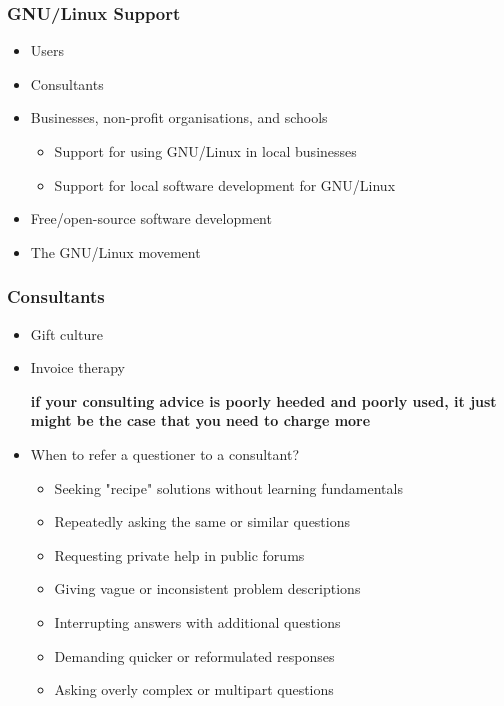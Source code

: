 \documentclass{beamer}
\begin{document}
	\begin{frame}
		\frametitle{GNU/Linux Support}
		\begin{itemize}
			\pause
			\item Users
			\pause
			\item Consultants
			\pause
			\item Businesses, non-profit organisations, and schools
			\begin{itemize}
				\pause
				\item Support for using GNU/Linux in local businesses
				\pause
				\item Support for local software development for GNU/Linux
			\end{itemize}
			\pause
			\item Free/open-source software development
			\pause
			\item The GNU/Linux movement
		\end{itemize}
	\end{frame}

	\begin{frame}
		\frametitle{Consultants}
		\begin{itemize}
			\pause
			\item Gift culture
			\pause
			\item Invoice therapy
			\pause

			{\bfseries if your consulting advice is poorly heeded and poorly used,
			it just might be the case that you need to charge more}
			\pause
			\item When to refer a questioner to a consultant?
			\begin{itemize}
				\pause
				\item Seeking "recipe" solutions without learning fundamentals
				\pause
				\item Repeatedly asking the same or similar questions
				\pause
				\item Requesting private help in public forums
				\pause
				\item Giving vague or inconsistent problem descriptions
				\pause
				\item Interrupting answers with additional questions
				\pause
				\item Demanding quicker or reformulated responses
				\pause
				\item Asking overly complex or multipart questions
			\end{itemize}
		\end{itemize}
	\end{frame}
\end{document}
